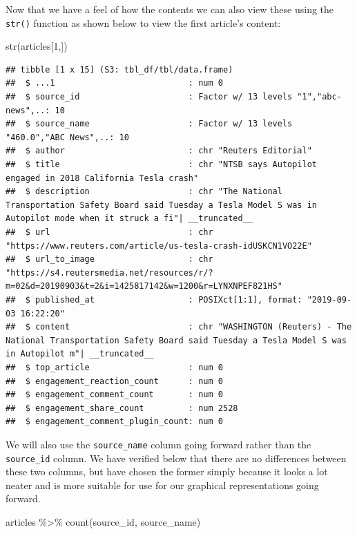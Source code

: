\documentclass[
]{article}
\newenvironment{Shaded}{\begin{snugshade}}{\end{snugshade}}
\newcommand{\DecValTok}[1]{\textcolor[rgb]{0.00,0.00,0.81}{#1}}
\newcommand{\FunctionTok}[1]{\textcolor[rgb]{0.00,0.00,0.00}{#1}}
\newcommand{\NormalTok}[1]{#1}
\newcommand{\SpecialCharTok}[1]{\textcolor[rgb]{0.00,0.00,0.00}{#1}}
\begin{document}
Now that we have a feel of how the contents we can also view these using
the \texttt{str()} function as shown below to view the first article's
content:

\begin{Shaded}
\begin{Highlighting}[]
\FunctionTok{str}\NormalTok{(articles[}\DecValTok{1}\NormalTok{,])}
\end{Highlighting}
\end{Shaded}

\begin{verbatim}
## tibble [1 x 15] (S3: tbl_df/tbl/data.frame)
##  $ ...1                           : num 0
##  $ source_id                      : Factor w/ 13 levels "1","abc-news",..: 10
##  $ source_name                    : Factor w/ 13 levels "460.0","ABC News",..: 10
##  $ author                         : chr "Reuters Editorial"
##  $ title                          : chr "NTSB says Autopilot engaged in 2018 California Tesla crash"
##  $ description                    : chr "The National Transportation Safety Board said Tuesday a Tesla Model S was in Autopilot mode when it struck a fi"| __truncated__
##  $ url                            : chr "https://www.reuters.com/article/us-tesla-crash-idUSKCN1VO22E"
##  $ url_to_image                   : chr "https://s4.reutersmedia.net/resources/r/?m=02&d=20190903&t=2&i=1425817142&w=1200&r=LYNXNPEF821HS"
##  $ published_at                   : POSIXct[1:1], format: "2019-09-03 16:22:20"
##  $ content                        : chr "WASHINGTON (Reuters) - The National Transportation Safety Board said Tuesday a Tesla Model S was in Autopilot m"| __truncated__
##  $ top_article                    : num 0
##  $ engagement_reaction_count      : num 0
##  $ engagement_comment_count       : num 0
##  $ engagement_share_count         : num 2528
##  $ engagement_comment_plugin_count: num 0
\end{verbatim}

We will also use the \texttt{source\_name} column going forward rather
than the \texttt{source\_id} column. We have verified below that there
are no differences between these two columns, but have chosen the former
simply because it looks a lot neater and is more suitable for use for
our graphical representations going forward.

\begin{Shaded}
\begin{Highlighting}[]
\NormalTok{articles }\SpecialCharTok{\%\textgreater{}\%}
  \FunctionTok{count}\NormalTok{(source\_id, source\_name)}
\end{Highlighting}
\end{Shaded}
\end{document}
